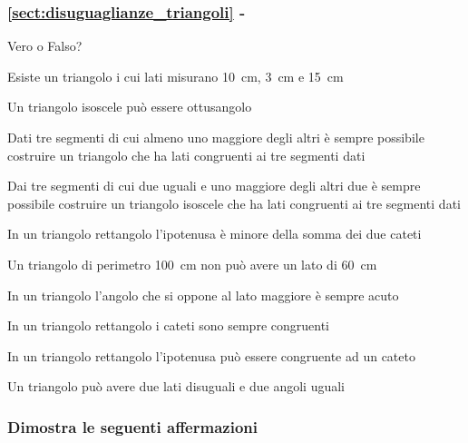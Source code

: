 \begingroup
\hypersetup{linkcolor=black}
\subsubsection*{\ref{sect:disuguaglianze_triangoli} - }
\endgroup

\begin{esercizio}
\label{ese:3.82}
Vero o Falso? 
\begin{enumeratea}
\item Esiste un triangolo i cui lati misurano 10~cm, 3~cm e 15~cm\hfill\boxV\quad\boxF
\item Un triangolo isoscele può essere ottusangolo\hfill\boxV\quad\boxF
\item Dati tre segmenti di cui almeno uno maggiore degli altri è sempre possibile costruire un triangolo che ha lati congruenti ai tre segmenti dati\hfill\boxV\quad\boxF
\item Dai tre segmenti di cui due uguali e uno maggiore degli altri due è sempre possibile costruire un triangolo isoscele che ha lati congruenti ai tre segmenti dati\hfill\boxV\quad\boxF
\item In un triangolo rettangolo l'ipotenusa è minore della somma dei due cateti\hfill\boxV\quad\boxF
\item Un triangolo di perimetro 100~cm non può avere un lato di 60~cm\hfill\boxV\quad\boxF
\item In un triangolo l'angolo che si oppone al lato maggiore è sempre acuto\hfill\boxV\quad\boxF
\item In un triangolo rettangolo i cateti sono sempre congruenti\hfill\boxV\quad\boxF
\item In un triangolo rettangolo l'ipotenusa può essere congruente ad un cateto\hfill\boxV\quad\boxF
\item Un triangolo può avere due lati disuguali e due angoli uguali\hfill\boxV\quad\boxF
\end{enumeratea}
\end{esercizio}

\subsubsection*{Dimostra le seguenti affermazioni}

